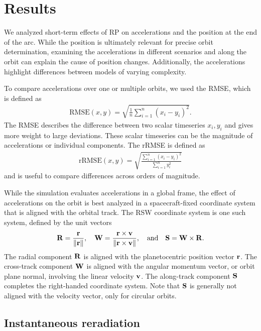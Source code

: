 \section{Results}

We analyzed short-term effects of \gls{RP} on accelerations and the position at the end of the arc. While the position is ultimately relevant for precise orbit determination, examining the accelerations in different scenarios and along the orbit can explain the cause of position changes. Additionally, the accelerations highlight differences between models of varying complexity.

To compare accelerations over one or multiple orbits, we used the \gls{RMSE}, which is defined as
\begin{align}
    \text{RMSE}(x, y) = \sqrt{\frac{1}{n}\sum_{i=1}^{n}\left(x_i - y_i\right)^2}.
\end{align}
The \gls{RMSE} describes the difference between two scalar timeseries $x_i, y_i$ and gives more weight to large deviations. These scalar timeseries can be the magnitude of accelerations or individual components. The \gls{rRMSE} is defined as
\begin{align}
    \text{rRMSE}(x, y) = \sqrt{\frac{\sum_{i=1}^{n}\left(x_i - y_i\right)^2}{\sum_{i=1}^{n} y_i^2}}
\end{align}
and is useful to compare differences across orders of magnitude.

While the simulation evaluates accelerations in a global frame, the effect of accelerations on the orbit is best analyzed in a spacecraft-fixed coordinate system that is aligned with the orbital track. The RSW coordinate system is one such system, defined by the unit vectors~\cite{Vallado2013}
\begin{align}
    \vb R = \frac{\vb r}{\norm{\vb r}}, \quad
    \vb W = \frac{\vb r \times \vb v}{\norm{\vb r \times \vb v}},
    \quad \textrm{and} \quad \vb S = \vb W \times \vb R.
\end{align}
The radial component $\vb R$ is aligned with the planetocentric position vector $\vb r$. The cross-track component $\vb W$ is aligned with the angular momentum vector, or orbit plane normal, involving the linear velocity $\vb v$. The along-track component $\vb S$ completes the right-handed coordinate system. Note that $\vb S$ is generally not aligned with the velocity vector, only for circular orbits.





\subsection{Instantaneous reradiation}
\label{subsec:inst-rerad}

